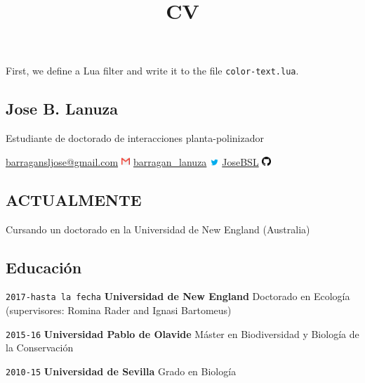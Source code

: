 \documentclass[
]{article}
\title{CV}
\author{}
\date{\vspace{-2.5em}}
\begin{document}
\maketitle

First, we define a Lua filter and write it to the file
\texttt{color-text.lua}.

\hypertarget{jose-b.-lanuza}{%
\subsection{Jose B. Lanuza}\label{jose-b.-lanuza}}

Estudiante de doctorado de interacciones planta-polinizador

\href{https://mail.google.com/mail/u/0/\#inbox}{barragansljose@gmail.com}
\includegraphics[width=0.025\textwidth,height=\textheight]{gmaillogo.png}\textbar{}
\href{https://twitter.com/?lang=es}{barragan\_lanuza}
\includegraphics[width=0.025\textwidth,height=\textheight]{twitterlogo.png}\textbar{}
\href{https://github.com/JoseBSL}{JoseBSL}
\includegraphics[width=0.025\textwidth,height=\textheight]{gitlogo.png}

\hypertarget{actualmente}{%
\subsection{ACTUALMENTE}\label{actualmente}}

Cursando un doctorado en la Universidad de New England (Australia)

\hypertarget{educaciuxf3n}{%
\subsection{Educación}\label{educaciuxf3n}}

\texttt{2017-hasta\ la\ fecha} \textbf{Universidad de New England}
Doctorado en Ecología (supervisores: Romina Rader and Ignasi Bartomeus)

\texttt{2015-16} \textbf{Universidad Pablo de Olavide} Máster en
Biodiversidad y Biología de la Conservación

\texttt{2010-15} \textbf{Universidad de Sevilla} Grado en Biología
\end{document}
